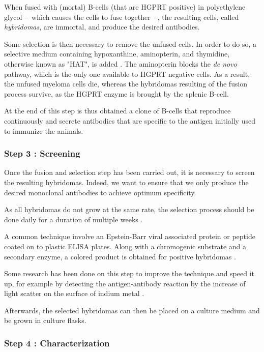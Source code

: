 When fused with (mortal) B-cells (that are HGPRT positive)
in polyethylene glycol --~which causes the cells to fuse together~--,
the resulting cells, called \emph{hybridomas}, are immortal,
and produce the desired antibodies.

Some selection is then necessary to remove the unfused cells. In order
to do so, a selective medium containing hypoxanthine, aminopterin, and 
thymidine, otherwise known as "HAT", is added \cite{nelson_monoclonal_2000}. 
The aminopterin blocks the \emph{de novo} pathway, which is the only one 
available to HGPRT negative cells. As a result, the unfused myeloma cells die,
whereas the hybridomas resulting of the fusion process survive, as the
HGPRT enzyme is brought by the splenic B-cell.

At the end of this step is thus obtained a clone of B-cells that reproduce
continuously and secrete antibodies that are specific to the antigen
initially used to immunize the animals.

\subsubsection{Step 3 : Screening}

Once the fusion and selection step has been carried out, it is necessary
to screen the resulting hybridomas. Indeed, we want to ensure that we
only produce the desired monoclonal antibodies to achieve optimum
specificity.

As all hybridomas do not grow at the same rate, the selection process
should be done daily for a duration of multiple weeks \cite{nelson_monoclonal_2000}.

A common technique involve an Epstein-Barr viral associated protein or peptide
coated on to plastic ELISA plates. Along with a chromogenic substrate and a
secondary enzyme, a colored product is obtained
for positive hybridomas \cite{grunow_cell_1994} \cite{nelson_monoclonal_2000}.

Some research has been done on this step to improve the technique and
speed it up, for example by detecting the antigen-antibody reaction by the 
increase of light scatter on the surface of indium metal \cite{rej_screening_1988}.

Afterwards, the selected hybridomas can then be placed on a culture medium
and be grown in culture flasks.

\subsubsection{Step 4 : Characterization}

